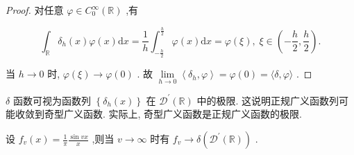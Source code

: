 \documentclass[lang=cn,newtx,10pt,scheme=chinese,thmcnt=chapter]{elegantbook}
\newcommand{\dif}{\mathrm{d}}
\begin{document}
\begin{proof}
  对任意 \(\varphi  \in  {C}_{0}^{\infty }\left( \mathbb{R}\right)\) ,有

\begin{equation*}
{\int }_{\mathbb{R}}{\delta }_{h}\left( x\right) \varphi \left( x\right) {\dif x} = \frac{1}{h}{\int }_{-\frac{h}{2}}^{\frac{h}{2}}\varphi \left( x\right) {\dif x} = \varphi \left( \xi \right) ,\;\xi  \in  \left( {-\frac{h}{2},\frac{h}{2}}\right) .
\end{equation*}

当 \(h \rightarrow  0\) 时, \(\varphi \left( \xi \right)  \rightarrow  \varphi \left( 0\right)\) . 故 \(\mathop{\lim }\limits_{{h \rightarrow  0}}\left\langle  {{\delta }_{h},\varphi }\right\rangle   = \varphi \left( 0\right)  = \langle \delta ,\varphi \rangle\) .

\end{proof}
\begin{note}
  \(\delta\) 函数可视为函数列 \(\left\{  {{\delta }_{h}\left( x\right) }\right\}\) 在 \({\mathcal{D}}^{\prime }\left( \mathbb{R}\right)\) 中的极限. 这说明正规广义函数列可能收敛到奇型广义函数. 实际上, 奇型广义函数是正规广义函数的极限. 
\end{note}
\begin{example}
  设 \({f}_{v}\left( x\right)  = \frac{1}{\pi }\frac{\sin {vx}}{x}\) ,则当 \(v \rightarrow  \infty\) 时有 \({f}_{v} \rightarrow  \delta \left( {{\mathcal{D}}^{\prime }\left( \mathbb{R}\right) }\right)\) .

\end{example}
\end{document}
